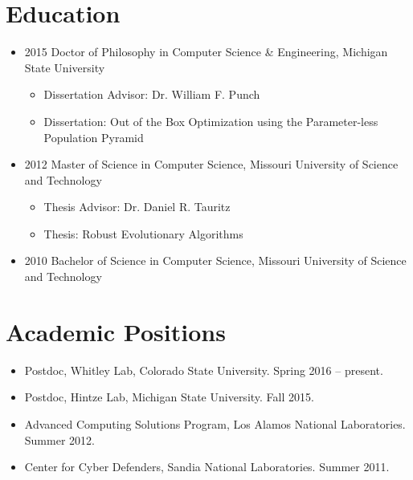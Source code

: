 \documentclass[a4paper,11pt]{article}
\begin{document}
\maketitle
 
\section{Education}
\begin{itemize}
\item 2015 Doctor of Philosophy in Computer Science \& Engineering, Michigan State University
\begin{itemize}
  \item Dissertation Advisor:  Dr. William F. Punch%
  \item Dissertation: Out of the Box Optimization using the Parameter-less Population Pyramid
\end{itemize}
\item 2012 Master of Science in Computer Science, Missouri University of Science and Technology
\begin{itemize}
  \item Thesis Advisor:  Dr. Daniel R. Tauritz%
  \item Thesis: Robust Evolutionary Algorithms
\end{itemize}
\item 2010 Bachelor of Science in Computer Science, Missouri University of Science and Technology
\end{itemize}
\section{Academic Positions}
\begin{itemize}
\item Postdoc, Whitley Lab, Colorado State University. Spring 2016 -- present.
\item Postdoc, Hintze Lab, Michigan State University. Fall 2015.
\item Advanced Computing Solutions Program, Los Alamos National Laboratories. Summer 2012.
\item Center for Cyber Defenders, Sandia National Laboratories. Summer 2011.
\end{itemize}

\begin{peer-publications}
\end{peer-publications}
\end{document}
